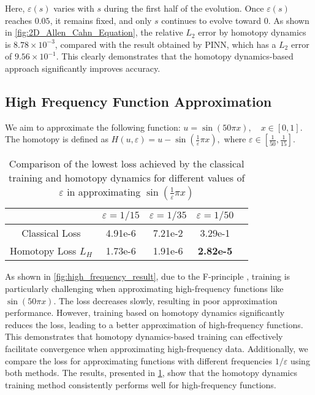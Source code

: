Here, $\varepsilon(s)$ varies with $s$ during the first half of the evolution. Once $\varepsilon(s)$ reaches $0.05$, it remains fixed, and only $s$ continues to evolve toward $0$. As shown in \cref{fig:2D_Allen_Cahn_Equation}, the relative $L_2$ error by homotopy dynamics is $8.78 \times 10^{-3}$, compared with the result obtained by PINN, which has a $L_2$ error of $9.56 \times 10^{-1}$. This clearly demonstrates that the homotopy dynamics-based approach significantly improves accuracy.

\subsection{High Frequency Function Approximation }
We aim to approximate the following function:
$u=    \sin(50\pi x), \quad x \in [0,1].$
The homotopy is defined as $H(u,\varepsilon) = u - \sin(\frac{1}{\varepsilon}\pi x), $
where $\varepsilon \in [\frac{1}{50},\frac{1}{15}]$.

\begin{table}[htbp!]
    \caption{Comparison of the lowest loss achieved by the classical training and homotopy dynamics for different values of $\varepsilon$ in approximating $\sin\left(\frac{1}{\varepsilon} \pi x\right)$
    }
    \vskip 0.15in
    \centering
    \tiny
    \begin{tabular}{|c|c|c|c|c|} 
    \hline 
    $ $ & $\varepsilon = 1/15$ & $\varepsilon = 1/35$ & $\varepsilon = 1/50$ \\ \hline 
    Classical Loss                & 4.91e-6     & 7.21e-2     & 3.29e-1       \\ \hline 
    Homotopy Loss $L_H$                      & 1.73e-6     & 1.91e-6     & \textbf{2.82e-5}       \\ \hline
    \end{tabular}
    \label{tab:loss_approximate}
\end{table}

As shown in \cref{fig:high_frequency_result}, due to the F-principle \cite{xu2024overview}, training is particularly challenging when approximating high-frequency functions like $\sin(50\pi x)$. The loss decreases slowly, resulting in poor approximation performance. However, training based on homotopy dynamics significantly reduces the loss, leading to a better approximation of high-frequency functions. This demonstrates that homotopy dynamics-based training can effectively facilitate convergence when approximating high-frequency data. Additionally, we compare the loss for approximating functions with different frequencies $1/\varepsilon$ using both methods. The results, presented in \cref{tab:loss_approximate}, show that the homotopy dynamics training method consistently performs well for high-frequency functions.





